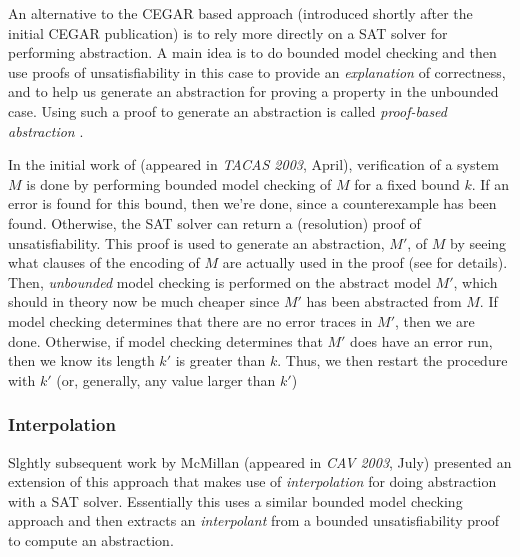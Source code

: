 \documentclass[10pt,a4paper]{article}
\begin{document}
An alternative to the CEGAR based approach (introduced shortly after the initial CEGAR publication) is to rely more directly on a SAT solver for performing abstraction. A main idea is to do bounded model checking and then use proofs of unsatisfiability in this case to provide an \textit{explanation} of correctness, and to help us generate an abstraction for proving a property in the unbounded case. Using such a proof to generate an abstraction is called \textit{proof-based abstraction} \cite{2003abswithoutcex}. 

In the initial work of \cite{2003abswithoutcex} (appeared in \textit{TACAS 2003}, April), verification of a system $M$ is done by performing bounded model checking of $M$ for  a fixed bound $k$. If an error is found for this bound, then we're done, since a counterexample has been found. Otherwise, the SAT solver can return a (resolution) proof of unsatisfiability. This proof is used to generate an abstraction, $M'$, of $M$ by seeing what clauses of the encoding of $M$ are actually used in the proof (see \cite{2003abswithoutcex} for details). Then, \textit{unbounded} model checking is performed on the abstract model $M'$, which should in theory now be much cheaper since $M'$ has been abstracted from $M$. If model checking determines that there are no error traces in $M'$, then we are done. Otherwise, if model checking determines that $M'$ does have an error run, then we know its length $k'$ is greater than $k$. Thus, we then restart the procedure with $k'$ (or, generally, any value larger than $k'$)

\subsubsection*{Interpolation}

Slghtly subsequent work by McMillan \cite{2003satinterp} (appeared in \textit{CAV 2003}, July) presented an extension of this approach that makes use of \textit{interpolation} for doing abstraction with a SAT solver. Essentially this uses a similar bounded model checking approach and then extracts an \textit{interpolant} from a bounded unsatisfiability proof to compute an abstraction.
\end{document}
